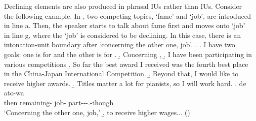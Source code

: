 Declining elements are also produced in phrasal IUs rather than  IUs.
Consider the following example.
In \Next,
two competing topics,  `fame' and  `job',
are introduced in line a.
Then, the speaker starts to talk about fame first and moves onto `job' in line g,
where the   `job' is considered to be declining.
In this case, there is an intonation-unit boundary after  `concerning the other one, job'.
%
\ex.
 \a. I have two goals: one is for  and the other is for .
 \b. Concerning ,
 \b. I have been participating in various  competitions
 \b. So far the best award I received was the fourth best place in the China-Japan International Competition.
 \b. Beyond that, I would like to receive higher awards.
 \b. Titles matter a lot for pianists, so I will work hard.
 \bg. de {\iub} ato-wa {\iub}  {\iub}  {\iub} \\
 	then {} remaining- {} job- {} part---.-though {} \\
	`Concerning the other one, job,'
 \b. to receive higher wages...
\hfill{()}
%


%


